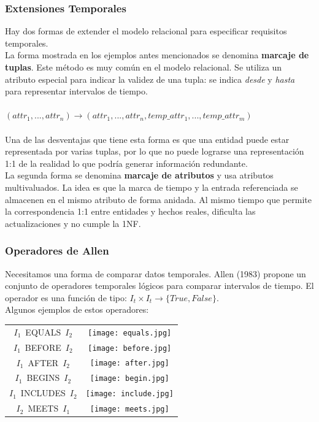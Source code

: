 \documentclass[a4paper,12pt,oneside]{report}
\begin{document}
\subsubsection*{Extensiones Temporales}
Hay dos formas de extender el modelo relacional para especificar requisitos temporales.\\
La forma mostrada en los ejemplos antes mencionados se denomina \textbf{marcaje de tuplas}. Este m\'etodo es muy com\'un en el modelo relacional. Se utiliza un atributo especial para indicar la validez de una tupla: se indica \textit{desde} y \textit{hasta} para representar intervalos de tiempo.\\
\ \\
$(attr_1, ..., attr_n) \rightarrow (attr_1, ..., attr_n, temp\_attr_1, ..., temp\_attr_m)$\\
\ \\Una de las desventajas que tiene esta forma es que una entidad puede estar representada por varias tuplas, por lo que no puede lograrse una representaci\'on 1:1 de la realidad lo que podr\'ia generar informaci\'on redundante.\\
La segunda forma se denomina \textbf{marcaje de atributos} y usa atributos multivaluados. La idea es que la marca de tiempo y la entrada referenciada  se almacenen en el mismo atributo de forma anidada. Al mismo tiempo que permite la correspondencia 1:1 entre entidades y hechos reales, dificulta las actualizaciones y no cumple la 1NF.
\subsubsection*{Operadores de Allen}
Necesitamos una forma de comparar datos temporales. Allen (1983) propone un conjunto 	de operadores temporales l\'ogicos para comparar intervalos de tiempo. El operador es una funci\'on de tipo: $I_{t} \times I_{t} \rightarrow \lbrace True, False \rbrace$.\\
Algunos ejemplos de estos operadores:
\begin{center}
\begin{tabular}{cc}
$I_{1}$\ EQUALS\ $I_{2}$ & \texttt{[image: equals.jpg]}\\
$I_{1}$\ BEFORE\ $I_{2}$ & \texttt{[image: before.jpg]}\\
$I_{1}$\ AFTER\ $I_{2}$ & \texttt{[image: after.jpg]}\\
$I_{1}$\ BEGINS\ $I_{2}$ & \texttt{[image: begin.jpg]}\\
$I_{1}$\ INCLUDES\ $I_{2}$ & \texttt{[image: include.jpg]}\\
$I_{2}$\ MEETS\ $I_{1}$ & \texttt{[image: meets.jpg]}\\
\end{tabular}
\end{center}
\end{document}
